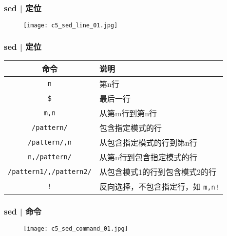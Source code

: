 \begin{frame}
  \frametitle{sed | 定位}
  \begin{figure}
    \centering
    \texttt{[image: c5\_sed\_line\_01.jpg]}
  \end{figure}
\end{frame}

\begin{frame}[fragile]
  \frametitle{sed | \alert{定位}}
  \begin{table}
    \centering
    \begin{tabularx}{\textwidth}{cX}
      \hline
      \rowcolor{blue!50}命令 & 说明\\
      \hline
      \verb|n| & 第n行\\
      \verb|$| & 最后一行\\
      \verb|m,n| & 从第m行到第n行\\
      \verb|/pattern/| & 包含指定模式的行\\
      \verb|/pattern/,n| & 从包含指定模式的行到第n行\\
      \verb|n,/pattern/| & 从第n行到包含指定模式的行\\
      \verb|/pattern1/,/pattern2/| & 从包含模式1的行到包含模式2的行\\
      \verb|!| & 反向选择，不包含指定行，如 \verb|m,n!|\\
      \hline
    \end{tabularx}
  \end{table}
\end{frame}

\begin{frame}
  \frametitle{sed | 命令}
  \begin{figure}
    \centering
    \texttt{[image: c5\_sed\_command\_01.jpg]}
  \end{figure}
\end{frame}

